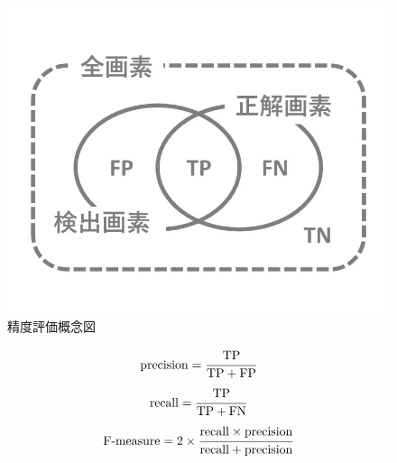 \documentclass[../Thesis]{subfiles}
\begin{document}
\begin{figure}[tbp]
	\centering
	\includegraphics[width=12cm]{img/evaluation.jpg}
	\caption{精度評価概念図}
	\label{img18}
\end{figure}

\begin{equation}
  \begin{array}{l}
  	{\rm precision} = \cfrac{{\rm TP}}{{\rm TP}+{\rm FP}} \\
  \end{array}
\label{form12}
\end{equation}
\begin{equation}
  \begin{array}{l}
  	{\rm recall} = \cfrac{{\rm TP}}{{\rm TP}+{\rm FN}} \\
  \end{array}
\label{form13}
\end{equation}
\begin{equation}
  \begin{array}{l}
  	{\rm F\mathchar`-measure} = 2 \times \cfrac{{\rm recall} \times {\rm precision}}{{\rm recall}+{\rm precision}}
  \end{array}
\label{form14}
\end{equation}
\end{document}
